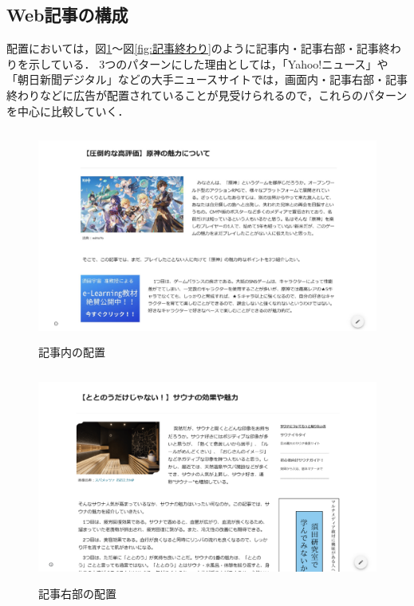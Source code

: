 \documentclass[12pt,a4j,titlepage]{ltjsarticle}
\begin{document}
\subsection{Web記事の構成}
配置においては，図\ref{fig:記事内}～図\ref{fig:記事終わり}のように記事内・記事右部・記事終わりを示している．
3つのパターンにした理由としては，「Yahoo!ニュース」や「朝日新聞デジタル」などの大手ニュースサイトでは，画面内・記事右部・記事終わりなどに広告が配置されていることが見受けられるので，これらのパターンを中心に比較していく．

\begin{figure}[H]
\begin{center}
 \includegraphics[height=70mm]{figures/記事内.pdf}
\end{center}
 \caption{記事内の配置}
 \label{fig:記事内}
\end{figure}

\begin{figure}[H]
\begin{center}
 \includegraphics[height=70mm]{figures/記事右部.pdf}
\end{center}
 \caption{記事右部の配置}
 \label{fig:記事右部}
\end{figure}
\end{document}

